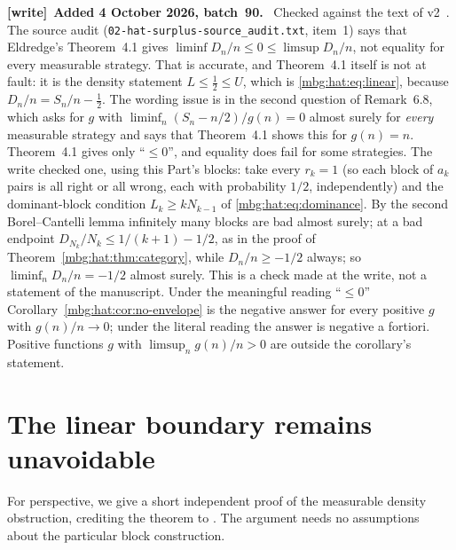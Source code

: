 \documentclass[11pt,letterpaper]{article}
\theoremstyle{definition}
\newenvironment{writenote}[1][]{\par\smallskip\begingroup\small
 \noindent\textbf{[write]}\if\relax\detokenize{#1}\relax\else~\textbf{#1.}\fi\ }%
 {\par\endgroup\smallskip}
\begin{document}
\begin{writenote}[Added 4 October 2026, batch~90]
Checked against the text of v2~\cite{hat:Eldredge}. The source audit (\texttt{02-hat-surplus-\allowbreak source\_\allowbreak audit.txt}, item~1) says that Eldredge's Theorem~4.1 gives $\liminf D_n/n\le0\le\limsup D_n/n$, not equality for every measurable strategy. That is accurate, and Theorem~4.1 itself is not at fault: it is the density statement $L\le\frac12\le U$, which is \eqref{mbg:hat:eq:linear}, because $D_n/n=S_n/n-\frac12$. The wording issue is in the second question of Remark~6.8, which asks for $g$ with $\liminf_n(S_n-n/2)/g(n)=0$ almost surely for \emph{every} measurable strategy and says that Theorem~4.1 shows this for $g(n)=n$. Theorem~4.1 gives only ``$\le0$'', and equality does fail for some strategies. The write checked one, using this Part's blocks: take every $r_k=1$ (so each block of $a_k$ pairs is all right or all wrong, each with probability $1/2$, independently) and the dominant-block condition $L_k\ge kN_{k-1}$ of \eqref{mbg:hat:eq:dominance}. By the second Borel--Cantelli lemma infinitely many blocks are bad almost surely; at a bad endpoint $D_{N_k}/N_k\le1/(k+1)-1/2$, as in the proof of Theorem~\ref{mbg:hat:thm:category}, while $D_n/n\ge-1/2$ always; so $\liminf_nD_n/n=-1/2$ almost surely. This is a check made at the write, not a statement of the manuscript. Under the meaningful reading ``$\le0$'' Corollary~\ref{mbg:hat:cor:no-envelope} is the negative answer for every positive $g$ with $g(n)/n\to0$; under the literal reading the answer is negative a fortiori. Positive functions $g$ with $\limsup_n g(n)/n>0$ are outside the corollary's statement.
\end{writenote}

\section{The linear boundary remains unavoidable}
\label{mbg:hat:sec:linear}

For perspective, we give a short independent proof of the measurable
density obstruction, crediting the theorem to
\cite[Theorem~4.1]{hat:Eldredge}. The argument needs no assumptions about
the particular block construction.
\end{document}
